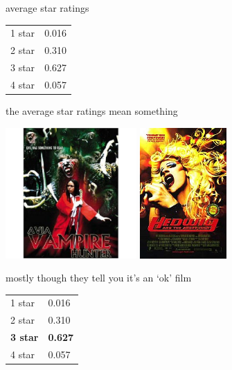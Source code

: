\documentclass{beamer}
\begin{document}

\begin{frame}{average star ratings}
  \begin{center}
    \begin{tabular}{l|l}
      \hline
      1 star&0.016\\
      2 star&0.310\\
      3 star&0.627\\
      4 star&0.057\\
      \hline
    \end{tabular}
  \end{center}
\end{frame}

\begin{frame}{the average star ratings mean something}
  \begin{center}
    \includegraphics[height=5cm]{avia_vampire_hunter.jpg}
    \includegraphics[height=5cm]{hedwig.jpg}
  \end{center}
\end{frame}


\begin{frame}{mostly though they tell you it's an `ok' film}
  \begin{center}
    \begin{tabular}{l|l}
      \hline
      1 star&0.016\\
      2 star&0.310\\
      \textbf{3 star}&\textbf{0.627}\\
      4 star&0.057\\
      \hline
    \end{tabular}
  \end{center}
\end{frame}
\end{document}
